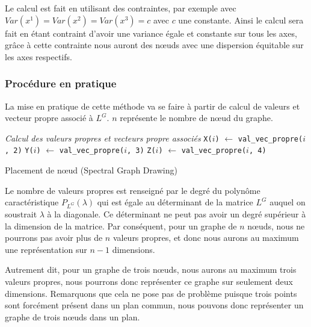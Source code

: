 \documentclass[a4paper, 11pt]{article}
\begin{document}
Le calcul est fait en utilisant des contraintes, par exemple avec $Var(x^1) = Var(x^2) = Var(x^3) = c$ avec $c$ une constante. Ainsi le calcul sera fait en étant contraint d'avoir une variance égale et constante sur tous les axes, grâce à cette contrainte nous auront des nœuds avec une dispersion équitable sur les axes respectifs.

\subsubsection{Procédure en pratique}

La mise en pratique de cette méthode va se faire à partir de calcul de valeurs et vecteur propre associé à $L^G$. $n$ représente le nombre de nœud du graphe.

\begin{algorithm}[H]

  \emph{Calcul des valeurs propres et vecteurs propre associés}
  \newline
      {
        \texttt{X($i$)} $\longleftarrow$ \texttt{val\_vec\_propre($i$, 2)}\;
        \texttt{Y($i$)} $\longleftarrow$ \texttt{val\_vec\_propre($i$, 3)}\;
        \texttt{Z($i$)} $\longleftarrow$ \texttt{val\_vec\_propre($i$, 4)}\;
      }
      \caption{Placement de nœud (Spectral Graph Drawing)}
\end{algorithm}

Le nombre de valeurs propres est renseigné par le degré du polynôme caractéristique $P_{L^G}(\lambda)$ qui est égale au déterminant de la matrice $L^G$ auquel on soustrait $\lambda$ à la diagonale. Ce déterminant ne peut pas avoir un degré supérieur à la dimension de la matrice. Par conséquent, pour un graphe de $n$ nœuds, nous ne pourrons pas avoir plus de $n$ valeurs propres, et donc nous aurons au maximum une représentation sur $n-1$ dimensions.

Autrement dit, pour un graphe de trois nœuds, nous aurons au maximum trois valeurs propres, nous pourrons donc représenter ce graphe sur seulement deux dimensions. Remarquons que cela ne pose pas de problème puisque trois points sont forcément présent dans un plan commun, nous pouvons donc représenter un graphe de trois nœuds dans un plan.
\end{document}
